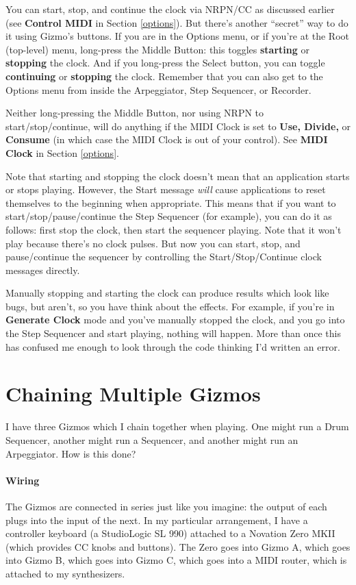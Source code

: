 \documentclass{article}
\begin{document}
		You can start, stop, and continue the clock via NRPN/CC as discussed earlier (see {\bf Control MIDI} in Section \ref{options}).   But there's another ``secret'' way to do it using Gizmo's buttons.  If you are in the Options menu, or if you're at the Root (top-level) menu, long-press the Middle Button: this toggles {\bf starting} or {\bf stopping} the clock.  And if you long-press the Select button, you can toggle {\bf continuing} or {\bf stopping} the clock.  Remember that you can also get to the Options menu from inside the Arpeggiator, Step Sequencer, or Recorder.
		
		Neither long-pressing the Middle Button, nor using NRPN to start/stop/continue, will do anything if the MIDI Clock is set to {\bf Use, Divide,} or {\bf Consume} (in which case the MIDI Clock is out of your control).  See {\bf MIDI Clock} in Section \ref{options}.
				
		Note that starting and stopping the clock doesn't mean that an application starts or stops playing.  However, the Start message {\it will} cause applications to reset themselves to the beginning when appropriate.   This means that if you want to start/stop/pause/continue the Step Sequencer (for example), you can do it as follows: first stop the clock, then start the sequencer playing.  Note that it won't play because there's no clock pulses.  But now you can start, stop, and pause/continue the sequencer by controlling the Start/Stop/Continue clock messages directly.
		
		Manually stopping and starting the clock can produce results which look like bugs, but aren't, so you have think about the effects.  For example, if you're in {\bf Generate Clock} mode and you've manually stopped the clock, and you go into the Step Sequencer and start playing, nothing will happen. More than once this has confused me enough to look through the code thinking I'd written an error.
		

\section{Chaining Multiple Gizmos}

I have three Gizmos which I chain together when playing. One might run a Drum Sequencer, another might run a Sequencer, and another might run an Arpeggiator.  How is this done?

\paragraph{Wiring} The Gizmos are connected in series just like you imagine: the output of each plugs into the input of the next.  In my particular arrangement, I have a controller keyboard (a StudioLogic SL 990) attached to a Novation Zero MKII (which provides CC knobs and buttons).  The Zero goes into Gizmo A, which goes into Gizmo B, which goes into Gizmo C, which goes into a MIDI router, which is attached to my synthesizers.  
\end{document}
